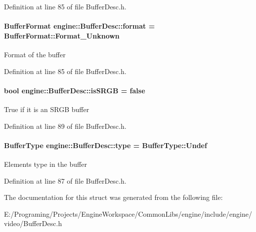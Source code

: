 Definition at line 85 of file Buffer\+Desc.\+h.

\paragraph[{\texorpdfstring{format}{format}}]{\setlength{\rightskip}{0pt plus 5cm}Buffer\+Format engine\+::\+Buffer\+Desc\+::format = Buffer\+Format\+::\+Format\+\_\+\+Unknown}\hypertarget{a00007_a99d4db16d6b3d3bbb5da5ac64610bb3a}{}\label{a00007_a99d4db16d6b3d3bbb5da5ac64610bb3a}
Format of the buffer 

Definition at line 85 of file Buffer\+Desc.\+h.

\paragraph[{\texorpdfstring{is\+S\+R\+GB}{isSRGB}}]{\setlength{\rightskip}{0pt plus 5cm}bool engine\+::\+Buffer\+Desc\+::is\+S\+R\+GB = false}\hypertarget{a00007_a50a45012458646eb58890de16c6f5fae}{}\label{a00007_a50a45012458646eb58890de16c6f5fae}
True if it is an S\+R\+GB buffer 

Definition at line 89 of file Buffer\+Desc.\+h.

\paragraph[{\texorpdfstring{type}{type}}]{\setlength{\rightskip}{0pt plus 5cm}Buffer\+Type engine\+::\+Buffer\+Desc\+::type = Buffer\+Type\+::\+Undef}\hypertarget{a00007_aaac2389a71fd61b51cd539da66fbc240}{}\label{a00007_aaac2389a71fd61b51cd539da66fbc240}
Elements type in the buffer 

Definition at line 87 of file Buffer\+Desc.\+h.



The documentation for this struct was generated from the following file\+:\begin{DoxyCompactItemize}
\item 
E\+:/\+Programing/\+Projects/\+Engine\+Workspace/\+Common\+Libs/engine/include/engine/video/Buffer\+Desc.\+h\end{DoxyCompactItemize}

